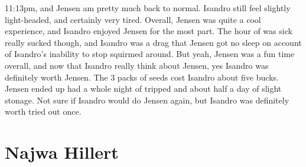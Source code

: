 \documentclass[12pt]{book}
\begin{document}
11:13pm, and Jensen am pretty much back to normal. Isandro still feel slightly light-headed, and certainly very tired. Overall, Jensen was quite a cool experience, and Isandro enjoyed Jensen for the most part. The hour of was sick really sucked though, and Isandro was a drag that Jensen got no sleep on account of Isandro's inability to stop squirmed around. But yeah, Jensen was a fun time overall, and now that Isandro really think about Jensen, yes Isandro was definitely worth Jensen. The 3 packs of seeds cost Isandro about five bucks. Jensen ended up had a whole night of tripped and about half a day of slight stonage. Not sure if Isandro would do Jensen again, but Isandro was definitely worth tried out once.



\chapter{Najwa Hillert}
\end{document}
